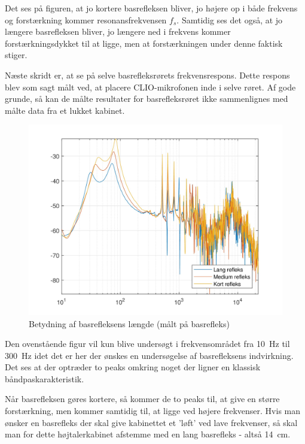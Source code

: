 Det ses på figuren, at jo kortere basrefleksen bliver, jo højere op i både frekvens og forstærkning kommer resonansfrekvensen $f_s$. Samtidig ses det også, at jo længere basrefleksen bliver, jo længere ned i frekvens kommer forstærkningsdykket til at ligge, men at forstærkningen under denne faktisk stiger.

Næste skridt er, at se på selve basrefleksrørets frekvensrespons. Dette respons blev som sagt målt ved, at placere CLIO-mikrofonen inde i selve røret. Af gode grunde, så kan de målte resultater for basrefleksrøret ikke sammenlignes med målte data fra et lukket kabinet.
\begin{figure}[H]
	\centering
	\vspace{-12pt}
	\includegraphics[width=\textwidth]{Billeder/Grafer/BasrefleksLengthTube}
	\caption{Betydning af basrefleksens længde (målt på basrefleks)}
\end{figure}

Den ovenstående figur vil kun blive undersøgt i frekvensområdet fra \SI{10}{\hertz} til \SI{300}{\hertz} idet det er her der ønskes en undersøgelse af basrefleksens indvirkning. Det ses at der optræder to peaks omkring noget der ligner en klassisk båndpaskarakteristik.

Når basrefleksen gøres kortere, så kommer de to peaks til, at give en større forstærkning, men kommer samtidig til, at ligge ved højere frekvenser. Hvis man ønsker en basrefleks der skal give kabinettet et 'løft' ved lave frekvenser, så skal man for dette højtalerkabinet afstemme med en lang basrefleks - altså \SI{14}{\centi\meter}.

